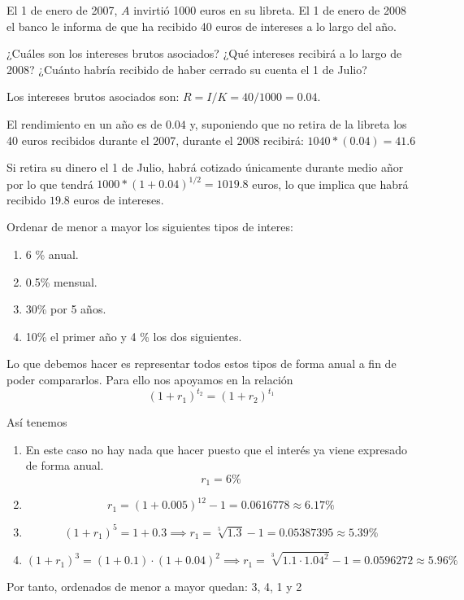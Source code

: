 \begin{problem}[2]
El 1 de enero de 2007, $A$ invirtió 1000 euros en su libreta. El 1 de enero de 2008 el banco le informa de que ha recibido 40 euros de intereses a lo largo del año.

\ppart ¿Cuáles son los intereses brutos asociados?
\ppart ¿Qué intereses recibirá a lo largo de 2008?
\ppart ¿Cuánto habría recibido de haber cerrado su cuenta el 1 de Julio?
\solution

\spart
Los intereses brutos asociados son: $R = I/K = 40/1000 = 0.04$.

\spart
El rendimiento en un año es de $0.04$ y, suponiendo que no retira de la libreta los 40 euros recibidos durante el 2007, durante el 2008 recibirá: $1040*(0.04)=41.6$

\spart
Si retira su dinero el 1 de Julio, habrá cotizado únicamente durante medio añor por lo que tendrá $1000*(1+0.04)^{1/2} = 1019.8$ euros, lo que implica que habrá recibido $19.8$ euros de intereses.

\end{problem}

\begin{problem}[3]
Ordenar de menor a mayor los siguientes tipos de interes:
\begin{enumerate}
\item 6 \% anual.
\item 0.5\% mensual.
\item 30\% por 5 años.
\item 10\% el primer año y 4 \% los dos siguientes.
\end{enumerate}
\solution

Lo que debemos hacer es representar todos estos tipos de forma anual a fin de poder compararlos. Para ello nos apoyamos en la relación
\[(1+r_1)^{t_2} = (1+r_2)^{t_1}\]

Así tenemos

\begin{enumerate}
\item En este caso no hay nada que hacer puesto que el interés ya viene expresado de forma anual.
\[r_1 = 6\% \]
\item
\[r_1 = (1+0.005)^12 - 1 = 0.0616778 \approx 6.17\%\]
\item
\[(1+r_1)^5 = 1+0.3 \implies r_1 = \sqrt[5]{1.3}-1 = 0.05387395 \approx 5.39\%\]
\item
\[(1+r_1)^3 = (1+0.1)\cdot (1+0.04)^2 \implies r_1 = \sqrt[3]{1.1 \cdot 1.04^2}-1 = 0.0596272 \approx 5.96\%\]
\end{enumerate}

Por tanto, ordenados de menor a mayor quedan: 3, 4, 1 y 2
\end{problem}

